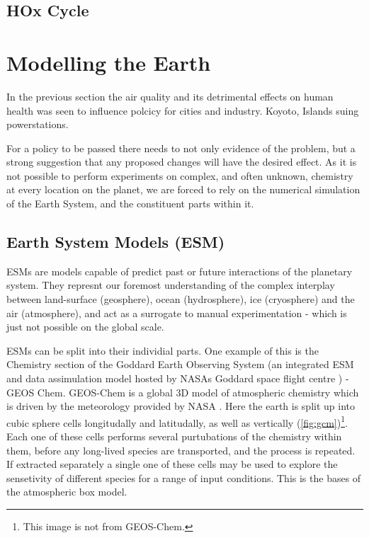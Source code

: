 \subsection{HOx Cycle}








\section{Modelling the Earth}
In the previous section the air quality and its detrimental effects on human health was seen to influence polcicy for cities and industry. Koyoto, Islands suing powerstations.

For a policy to be passed there needs to not only evidence of the problem, but a strong suggestion that any proposed changes will have the desired effect. As it is not possible to perform experiments on complex, and often unknown, chemistry at every location on the planet, we are forced to rely on the numerical simulation of the Earth System, and the constituent parts within it.

\subsection{Earth System Models (ESM)}

  ESMs are models capable of predict past or future interactions of the planetary system. They represnt our foremost understanding of the complex interplay between land-surface (geosphere), ocean (hydrosphere), ice (cryosphere) and the air (atmosphere), and act as a surrogate to manual experimentation -  which is just not possible on the global scale.

ESMs can be split into their individial parts. One example of this is the Chemistry section of the Goddard Earth Observing System (an integrated ESM and data assimulation model hosted by NASAs Goddard space flight centre \citep{geoschem}) - GEOS Chem. GEOS-Chem is a global 3D model of atmospheric chemistry which is driven by the meteorology provided by NASA \citep{geos}. Here the earth is split up into cubic sphere cells longitudally and latitudally, as well as vertically (\autoref{fig:gcm})\footnote{This image is not from GEOS-Chem.}. Each one of these cells performs several purtubations of the chemistry within them, before any long-lived species are transported, and the process is repeated. If extracted separately a single one of these cells may be used to explore the sensetivity of different species for a range of input conditions. This is the bases of the atmospheric box model.

